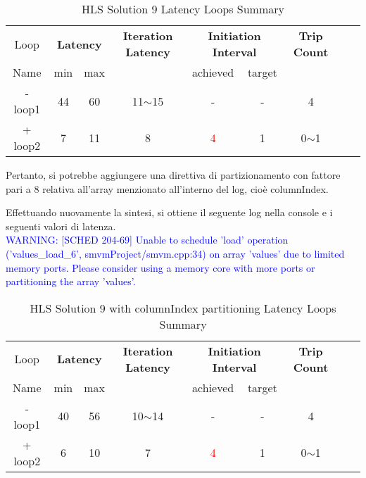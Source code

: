 \begin{table}[H]
	\centering
	\begin{tabular}{|c|c|c|c|c|c|c|c|c|}
		\hline
		\multicolumn{1}{|c|}{Loop} & \multicolumn{2}{|c|}{\textbf{Latency}} & \multicolumn{1}{c|}{\textbf{Iteration Latency}} & \multicolumn{2}{c|}{\textbf{Initiation Interval}} & \multicolumn{1}{c|}{\textbf{Trip Count}}  \\
		Name & min & max &  & achieved & target &  \\
		\hline
		- loop1 & 44 & 60 & 11$\sim$15 & - & - & 4 \\
		+ loop2 & 7 & 11 & 8 & \textcolor{red}{4} & 1 & 0$\sim$1 \\
		\hline
	\end{tabular}
	\caption{HLS Solution 9 Latency Loops Summary}
	\label{tab:hls-solution-9-loop-summary}
\end{table}

Pertanto, si potrebbe aggiungere una direttiva di partizionamento con fattore pari a 8 relativa all'array menzionato all'interno del log, cioè columnIndex.



Effettuando nuovamente la sintesi, si ottiene il seguente log nella console e i seguenti valori di latenza.
\\
\textcolor{blue}{WARNING: [SCHED 204-69] Unable to schedule 'load' operation ('values\_load\_6', smvmProject/smvm.cpp:34) on array 'values' due to limited memory ports. Please consider using a memory core with more ports or partitioning the array 'values'.}

\begin{table}[H]
	\centering
	\begin{tabular}{|c|c|c|c|c|c|c|c|c|}
		\hline
		\multicolumn{1}{|c|}{Loop} & \multicolumn{2}{|c|}{\textbf{Latency}} & \multicolumn{1}{c|}{\textbf{Iteration Latency}} & \multicolumn{2}{c|}{\textbf{Initiation Interval}} & \multicolumn{1}{c|}{\textbf{Trip Count}}  \\
		Name & min & max &  & achieved & target &  \\
		\hline
		- loop1 & 40 & 56 & 10$\sim$14 & - & - & 4 \\
		+ loop2 & 6 & 10 & 7 & \textcolor{red}{4} & 1 & 0$\sim$1 \\
		\hline
	\end{tabular}
	\caption{HLS Solution 9 with columnIndex partitioning Latency Loops Summary}
	\label{tab:hls-solution-9-columnindex-partitioning-loop-summary}
\end{table}

